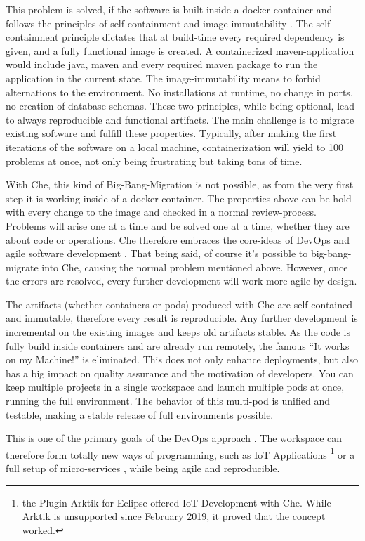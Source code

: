 \documentclass[english,utf8]{lni}
\begin{document}
This problem is solved, if the software is built inside a docker-container and follows the principles of self-containment and image-immutability \cite{BI17}.
The self-containment principle dictates that  at build-time every required dependency is given, and a fully functional image is created.
A containerized maven-application would include java, maven and every required maven package to run the application in the current state. 
The image-immutability means to forbid alternations to the environment. 
No installations at runtime, no change in ports, no creation of database-schemas.
These two principles, while being optional, lead to always reproducible and functional artifacts.
The main challenge is to migrate existing software and fulfill these properties. 
Typically, after making the first iterations of the software on a local machine, containerization will yield to 100 problems at once, not only being frustrating but taking tons of time. 

With Che, this kind of Big-Bang-Migration is not possible, as from the very first step it is working inside of a docker-container.
The properties above can be hold with every change to the image and checked in a normal review-process. 
Problems will arise one at a time and be solved one at a time, whether they are about code or operations. 
Che therefore embraces the core-ideas of DevOps \cite{HUE12}\cite{JA16} and agile software development \cite{EBE16}.
That being said, of course it's possible to big-bang-migrate into Che, causing the normal problem mentioned above. 
However, once the errors are resolved, every further development will work more agile by design.

The artifacts (whether containers or pods) produced with Che are self-contained and immutable, therefore every result is reproducible. 
Any further development is incremental on the existing images and keeps old artifacts stable. 
As the code is fully build inside containers and are already run remotely, the famous “It works on my Machine!” is eliminated. 
This does not only enhance deployments, but also has a big impact on quality assurance and the motivation of developers. 
You can keep multiple projects in a single workspace and launch multiple pods at once, running the full environment. 
The behavior of this multi-pod is unified and testable, making a stable release of full environments possible. 

This is one of the primary goals of the DevOps approach \cite{JA16}. 
The workspace can therefore form totally new ways of programming, such as IoT Applications \footnote{the Plugin Arktik for Eclipse offered IoT Development with Che. While Arktik is unsupported since February 2019, it proved that the concept worked.} or a full setup of micro-services \cite{IV18}, while being agile and reproducible.
\end{document}
